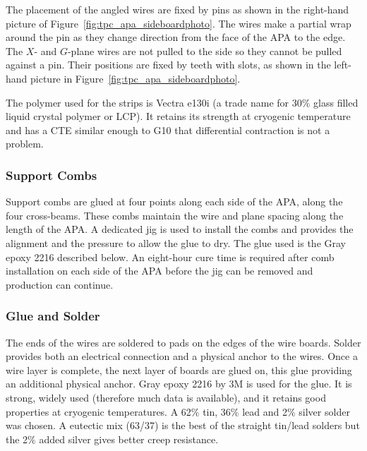 The placement of the angled wires are fixed by pins as shown in the right-hand picture of Figure~\ref{fig:tpc_apa_sideboardphoto}.  The wires make a partial wrap around the pin as they change direction from the face of the APA to the edge.  The $X$- and $G$-plane wires are not pulled to the side so they cannot be pulled against a pin.  Their positions are fixed by teeth with slots, as shown in the left-hand picture in Figure~\ref{fig:tpc_apa_sideboardphoto}. 
	
The polymer used for the strips is Vectra e130i (a trade name for 30$\%$ glass filled liquid crystal polymer or LCP). It retains its strength at cryogenic temperature and has a CTE similar enough to G10 that differential contraction is not a problem.


\subsubsection{Support Combs}
\label{sec:combs}

Support combs are glued at four points along each side of the APA, along the four cross-beams. These combs maintain the wire and plane spacing along the length of the APA. A dedicated jig is used to install the combs and provides the alignment and the pressure to allow the glue to dry. The glue used is the Gray epoxy 2216 described below. An eight-hour cure time is required after comb installation on each side of the APA before the jig can be removed and production can continue.


\subsubsection{Glue and Solder}
\label{sec:glue-solder}

The ends of the wires are soldered to pads on the edges of the wire boards.  Solder provides both an electrical connection and a physical anchor to the wires. Once a wire layer is complete, the next layer of boards are glued on, this glue providing an additional physical anchor. Gray epoxy 2216 by 3M is used for the glue.  It is strong, widely used (therefore much data is available), and it retains good properties at cryogenic temperatures.  A 62$\%$ tin, 36$\%$ lead and 2$\%$ silver solder was chosen.  A eutectic mix (63/37) is the best of the straight tin/lead solders but the 2$\%$ added silver gives better creep resistance.

